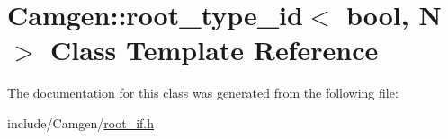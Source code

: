 \hypertarget{a00472}{\section{Camgen\-:\-:root\-\_\-type\-\_\-id$<$ bool, N $>$ Class Template Reference}
\label{a00472}
}


The documentation for this class was generated from the following file\-:\begin{DoxyCompactItemize}
\item 
include/\-Camgen/\hyperlink{a00732}{root\-\_\-if.\-h}\end{DoxyCompactItemize}
